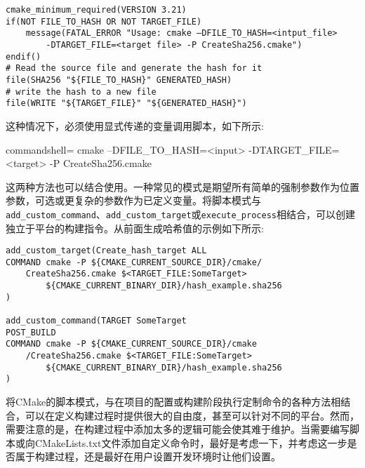 \begin{lstlisting}[style=styleCMake]
cmake_minimum_required(VERSION 3.21)
if(NOT FILE_TO_HASH OR NOT TARGET_FILE)
	message(FATAL_ERROR "Usage: cmake –DFILE_TO_HASH=<intput_file> 
		-DTARGET_FILE=<target file> -P CreateSha256.cmake")
endif()
# Read the source file and generate the hash for it
file(SHA256 "${FILE_TO_HASH}" GENERATED_HASH)
# write the hash to a new file
file(WRITE "${TARGET_FILE}" "${GENERATED_HASH}")
\end{lstlisting}

这种情况下，必须使用显式传递的变量调用脚本，如下所示:

\begin{tcblisting}{commandshell={}}
cmake –DFILE_TO_HASH=<input>
      -DTARGET_FILE=<target> -P CreateSha256.cmake
\end{tcblisting}

这两种方法也可以结合使用。一种常见的模式是期望所有简单的强制参数作为位置参数，可选或更复杂的参数作为已定义变量。将脚本模式与\texttt{add\_custom\_command}、\texttt{add\_custom\_target}或\texttt{execute\_process}相结合，可以创建独立于平台的构建指令。从前面生成哈希值的示例如下所示:

\begin{lstlisting}[style=styleCMake]
add_custom_target(Create_hash_target ALL
COMMAND cmake -P ${CMAKE_CURRENT_SOURCE_DIR}/cmake/
	CreateSha256.cmake $<TARGET_FILE:SomeTarget>
		${CMAKE_CURRENT_BINARY_DIR}/hash_example.sha256
)

add_custom_command(TARGET SomeTarget
POST_BUILD
COMMAND cmake -P ${CMAKE_CURRENT_SOURCE_DIR}/cmake
	/CreateSha256.cmake $<TARGET_FILE:SomeTarget>
		${CMAKE_CURRENT_BINARY_DIR}/hash_example.sha256
)
\end{lstlisting}

将CMake的脚本模式，与在项目的配置或构建阶段执行定制命令的各种方法相结合，可以在定义构建过程时提供很大的自由度，甚至可以针对不同的平台。然而，需要注意的是，在构建过程中添加太多的逻辑可能会使其难于维护。当需要编写脚本或向CMakeLists.txt文件添加自定义命令时，最好是考虑一下，并考虑这一步是否属于构建过程，还是最好在用户设置开发环境时让他们设置。





























